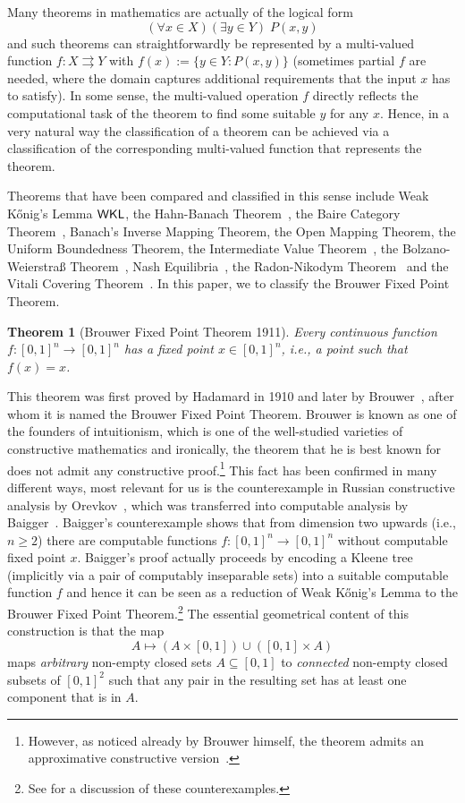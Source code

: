 \documentclass[a4paper]{amsart}
\def\In{\subseteq}
\def\mto{\rightrightarrows}
\def\WKL{\text{\rm\sffamily WKL}}
\newtheorem{theorem}{Theorem}[section]
\theoremstyle{definition}
\begin{document}
Many theorems in mathematics are actually of the logical form
\[(\forall x\in X)(\exists y\in Y)\;P(x,y)\]
and such theorems can straightforwardly be represented by a multi-valued function $f:X\mto Y$
with $f(x):=\{y\in Y:P(x,y)\}$ (sometimes partial $f$ are needed, where the domain captures
additional requirements that the input $x$ has to satisfy).
In some sense, the multi-valued operation $f$ directly reflects the computational task of the 
theorem to find some suitable $y$ for any $x$.
Hence, in a very natural way the classification of a theorem can be achieved via a classification of
the corresponding multi-valued function that represents the theorem.

Theorems that have been compared and classified in this sense include Weak K\H{o}nig's Lemma $\WKL$,
the Hahn-Banach Theorem~\cite{GM09}, the Baire Category Theorem~\cite{BHK18}, Banach's Inverse Mapping Theorem,
the Open Mapping Theorem, the Uniform Boundedness Theorem, the Intermediate Value
Theorem~\cite{BG11a}, the Bolzano-Weierstra\ss{} Theorem~\cite{BGM12}, 
Nash Equilibria~\cite{Pau10}, the Radon-Nikodym Theorem~\cite{HRW12} and the Vitali Covering Theorem~\cite{BGHP17}. 
In this paper, we to classify the Brouwer Fixed Point Theorem.

\begin{theorem}[Brouwer Fixed Point Theorem 1911]
Every continuous function $f:[0,1]^n\to[0,1]^n$ has a fixed point $x\in[0,1]^n$, i.e., a point such
that $f(x)=x$.
\end{theorem}

This theorem was first proved by Hadamard in 1910 and later by Brouwer~\cite{Bro11},
after whom it is named the Brouwer Fixed Point Theorem.
Brouwer is known as one of the founders of intuitionism, which is one of the well-studied
varieties of constructive mathematics and ironically, the theorem that he is best known for
does not admit any constructive proof.\footnote{However, as noticed already by Brouwer himself, 
the theorem admits an approximative constructive version~\cite{Bro52}.}
This fact has been confirmed in many different ways, most relevant for us is the 
counterexample in Russian constructive analysis by Orevkov~\cite{Ore63}, which
was transferred into computable analysis by Baigger~\cite{Bai85}.
Baigger's counterexample shows that from dimension two upwards (i.e., $n\geq2$) there are computable
functions $f:[0,1]^n\to[0,1]^n$ without computable fixed point $x$.
Baigger's proof actually proceeds by encoding a Kleene tree (implicitly via a pair of computably inseparable sets) 
into a suitable computable function $f$ and hence it can be seen as a reduction
of Weak K\H{o}nig's Lemma to the Brouwer Fixed Point Theorem.\footnote{See \cite{Pot08} for a discussion of these counterexamples.}
The essential geometrical content of this construction is that the map
\[A\mapsto (A\times[0,1])\cup([0,1]\times A)\]
maps {\em arbitrary} non-empty closed sets $A\In[0,1]$ to {\em connected} non-empty closed
subsets of $[0,1]^2$ such that any pair in the resulting set has at least one component that is in $A$. 
\end{document}
